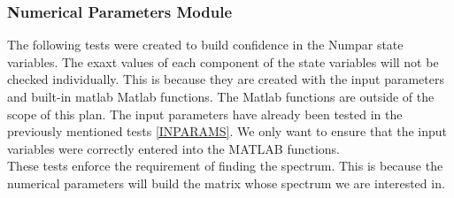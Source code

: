 \documentclass[12pt, titlepage]{article}
\begin{document}
\subsubsection{Numerical Parameters Module}

The following tests were created to build confidence in the Numpar state 
variables. The exaxt  values of each component of the state variables will not 
be checked individually. This is because they are created with the input 
parameters and built-in matlab {\wss Matlab} functions. The Matlab 
functions are outside of the scope 
of this plan. The input parameters have already been tested in the previously 
mentioned tests \ref{INPARAMS}. We only want to ensure that the input variables 
were correctly entered into the MATLAB functions. \\
These tests enforce the requirement of finding the spectrum. This is because 
the numerical 
parameters will build the matrix whose spectrum we are interested in. \\ 
\end{document}
